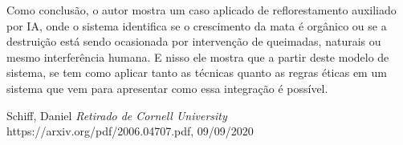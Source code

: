 \documentclass{article}
\begin{document}
Como conclusão, o autor mostra um caso aplicado de reflorestamento auxiliado por IA, onde o sistema identifica se o crescimento da mata é orgânico ou se a destruição está sendo ocasionada por intervenção de queimadas, naturais ou mesmo interferência humana. E nisso ele mostra que a partir deste modelo de sistema, se tem como aplicar tanto as técnicas quanto as regras éticas em um sistema que vem para apresentar como essa integração é possível.


\begin{thebibliography}{9}
Schiff, Daniel
\textit{Retirado de Cornell University}
 https://arxiv.org/pdf/2006.04707.pdf, 09/09/2020
\end{thebibliography}
\end{document}
